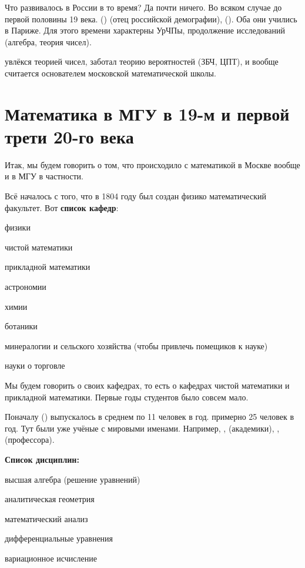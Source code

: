\documentclass[a4paper,oneside,fleqn,10pt]{article}
\begin{document}
Что развивалось в России в то время? Да почти ничего. Во всяком случае до первой половины 19 века.
 ()
(отец российской демографии), 
(). Оба они учились в Париже.
Для этого времени характерны УрЧПы, продолжение исследований  (алгебра, теория чисел).

 увлёкся теорией чисел, заботал теорию вероятностей (ЗБЧ, ЦПТ),
и вообще считается основателем московской математической
школы.


\section{Математика в МГУ в 19-м и первой трети 20-го века}

Итак, мы будем говорить о том, что происходило с математикой в Москве вообще
и в МГУ в частности.

Всё началось с того, что в 1804 году был создан физико математический факультет.
Вот \textbf{список кафедр}:
\begin{nums}{-2}
\item физики
\item чистой математики
\item прикладной математики
\item астрономии
\item химии
\item ботаники
\item минералогии и сельского хозяйства (чтобы привлечь помещиков к науке)
\item науки о торговле
\end{nums}

Мы будем говорить о своих кафедрах, то есть о кафедрах чистой математики
и прикладной математики. Первые годы студентов было совсем мало.

Поначалу () выпускалось в среднем по 11 человек в год.
 примерно 25 человек в год. Тут были уже учёные с мировыми
именами. Например, ,  (академики), ,  (профессора).

\textbf{Список дисциплин:}

\begin{nums}{-2}
\item высшая алгебра (решение уравнений)
\item аналитическая геометрия
\item математический анализ
\item дифференциальные уравнения
\item вариационное исчисление
\end{nums}
\end{document}
